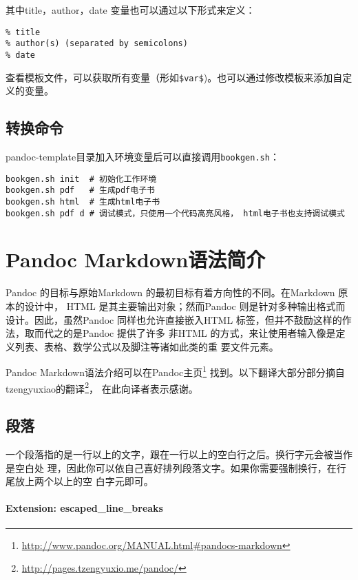 \documentclass[fancyhdr,bookmark]{ctexbook}
\renewcommand{\href}[2]{#2\footnote{\url{#1}}}
\begin{document}
其中title，author，date 变量也可以通过以下形式来定义：

\begin{lstlisting}
% title
% author(s) (separated by semicolons)
% date
\end{lstlisting}

查看模板文件，可以获取所有变量（形如\lstinline!$var$!)。也可以通过修改模板来添加自定义的变量。

\section{转换命令}\label{ux8f6cux6362ux547dux4ee4}

pandoc-template目录加入环境变量后可以直接调用\lstinline!bookgen.sh!：

\begin{lstlisting}
bookgen.sh init  # 初始化工作环境
bookgen.sh pdf   # 生成pdf电子书
bookgen.sh html  # 生成html电子书
bookgen.sh pdf d # 调试模式，只使用一个代码高亮风格， html电子书也支持调试模式
\end{lstlisting}

\chapter{Pandoc
Markdown语法简介}\label{pandoc-markdownux8bedux6cd5ux7b80ux4ecb}

Pandoc 的目标与原始Markdown 的最初目标有着方向性的不同。在Markdown
原本的设计中， HTML 是其主要输出对象；然而Pandoc
则是针对多种输出格式而设计。因此，虽然Pandoc 同样也允许直接嵌入HTML
标签，但并不鼓励这样的作法，取而代之的是Pandoc 提供了许多 非HTML
的方式，来让使用者输入像是定义列表、表格、数学公式以及脚注等诸如此类的重
要文件元素。

Pandoc
Markdown语法介绍可以在\href{http://www.pandoc.org/MANUAL.html\#pandocs-markdown}{Pandoc主页}
找到。以下翻译大部分部分摘自\href{http://pages.tzengyuxio.me/pandoc/}{tzengyuxiao的翻译}，
在此向译者表示感谢。

\section{段落}\label{ux6bb5ux843d}

一个段落指的是一行以上的文字，跟在一行以上的空白行之后。换行字元会被当作是空白处
理，因此你可以依自己喜好排列段落文字。如果你需要强制换行，在行尾放上两个以上的空
白字元即可。

\subsubsection{Extension:
escaped\_line\_breaks}\label{extension-escapedux5flineux5fbreaks}
\end{document}
